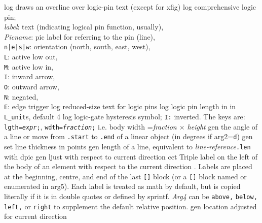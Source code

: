 %
  {log}%
  {draws an overline over logic-pin text (except for xfig)}%
%
  {log}%
  {comprehensive logic pin;\\
   {\sl label}: text (indicating logical pin function, usually),\\
   {\sl Picname}: pic label for referring to the pin (line),\\
   {\tt n|e|s|w}: orientation (north, south, east, west),\\
   {\tt L}: active low out,\\
   {\tt M}: active low in,\\
   {\tt I}: inward arrow,\\
   {\tt O}: outward arrow,\\
   {\tt N}: negated,\\
   {\tt E}: edge trigger}%
%
  {log}%
  {reduced-size text for logic pins}%
%
  {log}%
  {logic pin length in in {\tt L\_unit}s, default 4}%
%
  {log}%
  {logic-gate hysteresis symbol; {\tt I:} inverted. The keys are:
    {\tt lgth={\sl expr};}, 
    {\tt wdth={\sl fraction};} i.e. body width ={\sl fraction $\times$ height}}%
%
  {gen}%
  {the angle of a line or move from {\tt .start} to {\tt .end} of a linear
   object (in degrees if arg2={\tt d})}%
%
  {gen}%
  {set line thickness in points}%
%
  {gen}%
  {length of a line, equivalent to {\sl line-reference}{\tt .len}
   with dpic}%
%
  {gen}%
  {ljust with respect to current direction}%
%
  {cct}%
  {Triple label on the left of the body of an element with respect to the
    current direction .  Labels are placed at the
    beginning, centre, and end of the last {\tt []} block (or a {\tt []} block
    named or enumerated in arg5). Each label is treated as math by
    default, but is copied literally if it is in double quotes or defined
    by sprintf.  {\sl Arg4} can be {\tt above,} {\tt below,} {\tt left,}
    or {\tt right} to supplement the default relative position.}%
%
  {gen}%
  {location adjusted for current direction}%
